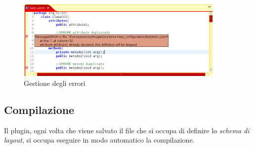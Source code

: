 \begin{figure}[htp]
\begin{center}
  \includegraphics[width=0.9\textwidth]{img/errori_editor.png}
  \caption[labelInTOC]{Gestione degli errori}
  \label{errorieditor} 
\end{center}
\end{figure} 

\subsection{Compilazione} 
Il plugin, ogni volta che viene salvato il file che si occupa di definire lo
\emph{schema di layout}, si occupa eseguire in modo automatico la compilazione.
